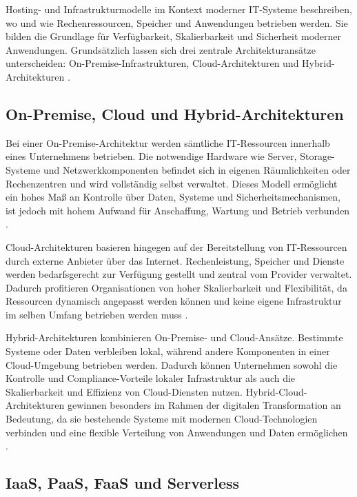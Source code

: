 Hosting- und Infrastrukturmodelle im Kontext moderner IT-Systeme beschreiben, wo und wie Rechenressourcen, Speicher und Anwendungen betrieben werden. Sie bilden die Grundlage für Verfügbarkeit, Skalierbarkeit und Sicherheit moderner Anwendungen. Grundsätzlich lassen sich drei zentrale Architekturansätze unterscheiden: On-Premise-Infrastrukturen, Cloud-Architekturen und Hybrid-Architekturen \cite{hws_onprem_cloud_hybrid, ibm_hybrid_cloud_architecture}.

\subsection{On-Premise, Cloud und Hybrid-Architekturen}

Bei einer On-Premise-Architektur werden sämtliche IT-Ressourcen innerhalb eines Unternehmens betrieben. Die notwendige Hardware wie Server, Storage-Systeme und Netzwerkkomponenten befindet sich in eigenen Räumlichkeiten oder Rechenzentren und wird vollständig selbst verwaltet. Dieses Modell ermöglicht ein hohes Maß an Kontrolle über Daten, Systeme und Sicherheitsmechanismen, ist jedoch mit hohem Aufwand für Anschaffung, Wartung und Betrieb verbunden \cite{hws_onprem_cloud_hybrid}.

Cloud-Architekturen basieren hingegen auf der Bereitstellung von IT-Ressourcen durch externe Anbieter über das Internet. Rechenleistung, Speicher und Dienste werden bedarfsgerecht zur Verfügung gestellt und zentral vom Provider verwaltet. Dadurch profitieren Organisationen von hoher Skalierbarkeit und Flexibilität, da Ressourcen dynamisch angepasst werden können und keine eigene Infrastruktur im selben Umfang betrieben werden muss \cite{hws_onprem_cloud_hybrid}.

Hybrid-Architekturen kombinieren On-Premise- und Cloud-Ansätze. Bestimmte Systeme oder Daten verbleiben lokal, während andere Komponenten in einer Cloud-Umgebung betrieben werden. Dadurch können Unternehmen sowohl die Kontrolle und Compliance-Vorteile lokaler Infrastruktur als auch die Skalierbarkeit und Effizienz von Cloud-Diensten nutzen. Hybrid-Cloud-Architekturen gewinnen besonders im Rahmen der digitalen Transformation an Bedeutung, da sie bestehende Systeme mit modernen Cloud-Technologien verbinden und eine flexible Verteilung von Anwendungen und Daten ermöglichen \cite{ibm_hybrid_cloud_architecture}.

\subsection{IaaS, PaaS, FaaS und Serverless}

